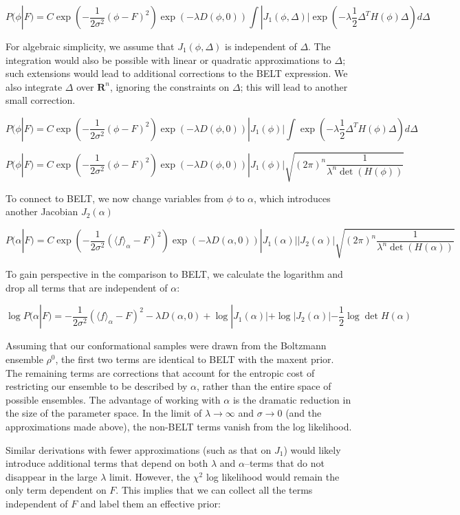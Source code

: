 \documentclass[12pt]{article}
\begin{document}
$$P(\phi | F) = C \exp(-\frac{1}{2\sigma^2} (\phi - F)^2) \exp(-\lambda  D(\phi, 0))  \int |J_1(\phi, \Delta)|  \exp(-\lambda \frac{1}{2} \Delta^T H(\phi) \Delta) d\Delta $$

For algebraic simplicity, we assume that $J_1(\phi, \Delta)$ is independent of $\Delta$.  The integration would also be possible with linear or quadratic approximations to $\Delta$; such extensions would lead to additional corrections to the BELT expression.  We also integrate $\Delta$ over $\mathbf{R}^n$, ignoring the constraints on $\Delta$; this will lead to another small correction.  

$$P(\phi | F) = C \exp(-\frac{1}{2\sigma^2} (\phi - F)^2) \exp(-\lambda  D(\phi, 0)) |J_1(\phi)|  \int   \exp(-\lambda \frac{1}{2} \Delta^T H(\phi) \Delta) d\Delta $$

$$P(\phi | F) = C \exp(-\frac{1}{2\sigma^2} (\phi - F)^2) \exp(-\lambda  D(\phi, 0)) |J_1(\phi)|  \sqrt{(2\pi)^n \frac{1}{\lambda^n \det (H(\phi))}}  $$

To connect to BELT, we now change variables from $\phi$ to $\alpha$, which introduces another Jacobian $J_2(\alpha)$

$$P(\alpha | F) = C \exp(-\frac{1}{2\sigma^2} (\langle f \rangle_\alpha - F)^2) \exp(-\lambda  D(\alpha, 0)) |J_1(\alpha)|  |J_2(\alpha)|  \sqrt{(2\pi)^n \frac{1}{\lambda^n \det (H(\alpha))}}$$

To gain perspective in the comparison to BELT, we calculate the logarithm and drop all terms that are independent of $\alpha$:

$$\log P(\alpha | F) = -\frac{1}{2\sigma^2} (\langle f \rangle_\alpha - F)^2 -\lambda  D(\alpha, 0) + \log |J_1(\alpha)| + \log |J_2(\alpha)| - \frac{1}{2} \log \det H(\alpha)$$

Assuming that our conformational samples were drawn from the Boltzmann ensemble $\rho^0$, the first two terms are identical to BELT with the maxent prior.  The remaining terms are corrections that account for the entropic cost of restricting our ensemble to be described by $\alpha$, rather than the entire space of possible ensembles.  The advantage of working with $\alpha$ is the dramatic reduction in the size of the parameter space.  In the limit of $\lambda \rightarrow \infty$ and $\sigma \rightarrow 0$ (and the approximations made above), the non-BELT terms vanish from the log likelihood.  

Similar derivations with fewer approximations (such as that on $J_1$) would likely introduce additional terms that depend on both $\lambda$ and $\alpha$--terms that do not disappear in the large $\lambda$ limit.  However, the $\chi^2$ log likelihood would remain the only term dependent on $F$.  This implies that we can collect all the terms independent of $F$ and label them an effective prior:
\end{document}
